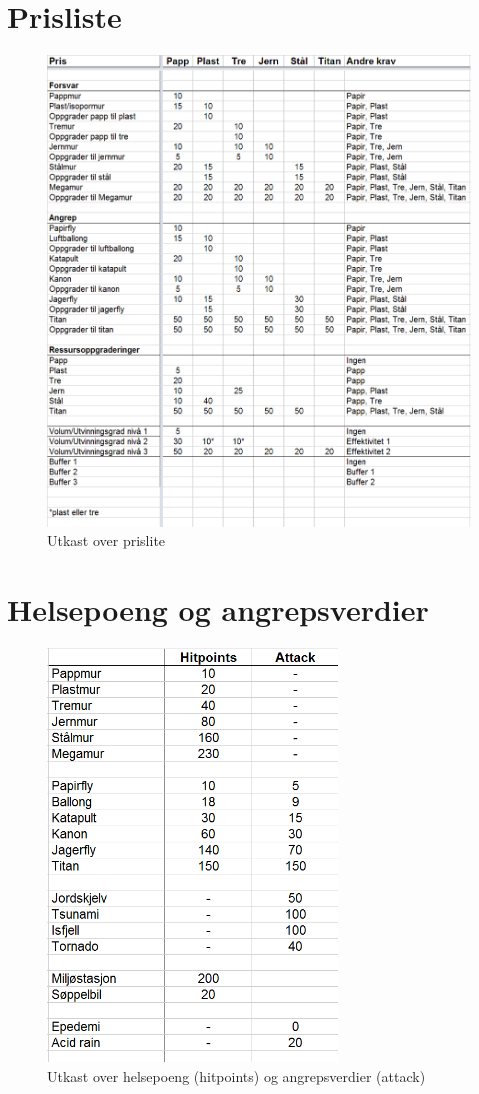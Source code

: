 \appendix {} \pagestyle{plain}
\section{Prisliste} \label{A}

			\begin{figure} [H]
				\begin{center}
				\includegraphics[width=155mm]{images/prisliste_stor}
				\caption{Utkast over prislite}
				\end{center}
			\end{figure}

\section{Helsepoeng og angrepsverdier} \label{B}

			\begin{figure} [H]
				\begin{center}
					\includegraphics[width=77mm]{images/hitpoints_attack_stor}
				\end{center}
				\caption{Utkast over helsepoeng (hitpoints) og angrepsverdier (attack)}
			\end{figure}
